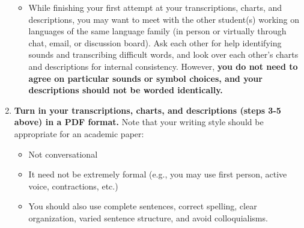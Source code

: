 \documentclass[12pt, letterpaper]{article}
\begin{document}
\begin{enumerate}
    \begin{itemize}
        \item While finishing your first attempt at your transcriptions, charts, and descriptions, you may want to meet with the other student(s) working on languages of the same language family (in person or virtually through chat, email, or discussion board). Ask each other for help identifying sounds and transcribing difficult words, and look over each other’s charts and descriptions for internal consistency. However, \textbf{you do not need to agree on particular sounds or symbol choices, and your descriptions should not be worded identically.}
    \end{itemize}
    \item \textbf{Turn in your transcriptions, charts, and descriptions (steps 3-5 above) in a PDF format.} Note that your writing style should be appropriate for an academic paper:
    \begin{itemize}
        \item Not conversational
        \item It need not be extremely formal (e.g., you may use first person, active voice, contractions, etc.)
        \item You should also use complete sentences, correct spelling, clear organization, varied sentence structure, and avoid colloquialisms.
    \end{itemize}
\end{enumerate}


\end{document}
